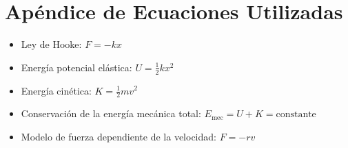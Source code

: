 \documentclass{article}
\begin{document}
\newpage
\section{Apéndice de Ecuaciones Utilizadas}
\begin{itemize}
    \item Ley de Hooke: \( F = -kx \)
    \item Energía potencial elástica: \( U = \frac{1}{2}kx^2 \)
    \item Energía cinética: \( K = \frac{1}{2}mv^2 \)
    \item Conservación de la energía mecánica total: \( E_{\text{mec}} = U + K = \text{constante} \)
    \item Modelo de fuerza dependiente de la velocidad: \( F = -rv \)
\end{itemize} \\
\end{document}
